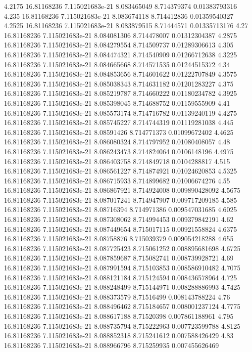 {4.2175 16.81168236 7.115021683e-21 8.083465049 8.714379374 0.01383793316
4.235 16.81168236 7.115021683e-21 8.083674118 8.714412836 0.01359540327
4.2525 16.81168236 7.115021683e-21 8.083879515 8.71444571 0.01335713176
4.27 16.81168236 7.115021683e-21 8.084081306 8.714478007 0.01312304387
4.2875 16.81168236 7.115021683e-21 8.084279554 8.714509737 0.01289306613
4.305 16.81168236 7.115021683e-21 8.084474321 8.714540909 0.01266712638
4.3225 16.81168236 7.115021683e-21 8.084665668 8.714571535 0.01244515372
4.34 16.81168236 7.115021683e-21 8.084853656 8.714601622 0.01222707849
4.3575 16.81168236 7.115021683e-21 8.085038343 8.714631182 0.01201283227
4.375 16.81168236 7.115021683e-21 8.085219787 8.714660222 0.01180234782
4.3925 16.81168236 7.115021683e-21 8.085398045 8.714688752 0.01159555909
4.41 16.81168236 7.115021683e-21 8.085573174 8.714716782 0.01139240119
4.4275 16.81168236 7.115021683e-21 8.085745227 8.714744319 0.01119281038
4.445 16.81168236 7.115021683e-21 8.08591426 8.714771373 0.01099672402
4.4625 16.81168236 7.115021683e-21 8.086080324 8.714797952 0.01080408057
4.48 16.81168236 7.115021683e-21 8.086243473 8.714824064 0.0106148196
4.4975 16.81168236 7.115021683e-21 8.086403758 8.714849718 0.0104288817
4.515 16.81168236 7.115021683e-21 8.086561227 8.714874921 0.01024620853
4.5325 16.81168236 7.115021683e-21 8.086715933 8.714899682 0.01006674276
4.55 16.81168236 7.115021683e-21 8.086867921 8.714924008 0.009890428092
4.5675 16.81168236 7.115021683e-21 8.087017241 8.714947907 0.009717209185
4.585 16.81168236 7.115021683e-21 8.08716394 8.714971386 0.009547031685
4.6025 16.81168236 7.115021683e-21 8.087308062 8.714994453 0.009379842191
4.62 16.81168236 7.115021683e-21 8.087449654 8.715017115 0.00921558824
4.6375 16.81168236 7.115021683e-21 8.08758876 8.715039379 0.009054218288
4.655 16.81168236 7.115021683e-21 8.087725423 8.715061252 0.008895681698
4.6725 16.81168236 7.115021683e-21 8.087859687 8.715082741 0.008739928721
4.69 16.81168236 7.115021683e-21 8.087991594 8.715103853 0.008586910482
4.7075 16.81168236 7.115021683e-21 8.088121184 8.715124594 0.008436578964
4.725 16.81168236 7.115021683e-21 8.088248499 8.715144971 0.008288886993
4.7425 16.81168236 7.115021683e-21 8.088373579 8.71516499 0.008143788224
4.76 16.81168236 7.115021683e-21 8.088496462 8.715184657 0.008001237124
4.7775 16.81168236 7.115021683e-21 8.088617188 8.71520398 0.007861188961
4.795 16.81168236 7.115021683e-21 8.088735794 8.715222963 0.007723599788
4.8125 16.81168236 7.115021683e-21 8.088852318 8.715241612 0.007588426429
4.83 16.81168236 7.115021683e-21 8.088966796 8.715259935 0.007455626469
}
